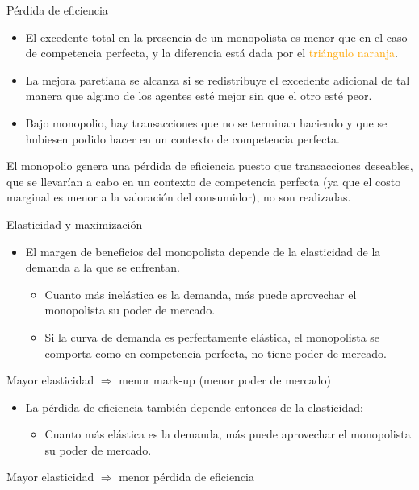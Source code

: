 \documentclass{beamer}
\begin{document}
\begin{frame}{Pérdida de eficiencia}
    \begin{itemize}
        \item El excedente total en la presencia
        de un monopolista es menor que en el caso de competencia perfecta, y la diferencia está dada por el \textcolor{orange}{triángulo naranja}.
        \item La mejora paretiana se alcanza si se redistribuye el excedente adicional de tal manera que alguno de los agentes esté mejor sin que el otro esté peor.
        \item Bajo monopolio, hay transacciones que no se terminan haciendo y que se hubiesen podido hacer en un contexto de competencia perfecta.
    \end{itemize}
    \begin{boxB}
    \centering
        El monopolio genera una pérdida de eficiencia puesto que transacciones deseables, que se llevarían a cabo en un contexto de competencia perfecta  (ya que el costo marginal es menor a la valoración del consumidor), no son realizadas.
    \end{boxB}
\end{frame}

\begin{frame}{Elasticidad y maximización}
    \begin{itemize}
    \item El margen de beneficios del monopolista depende de la elasticidad de la demanda a la que se enfrentan.
        \begin{itemize}
        \item  Cuanto más inelástica es la demanda, más puede aprovechar el monopolista  su poder de mercado. 
        \item Si la curva de demanda es perfectamente elástica, el monopolista se comporta como en competencia perfecta, no tiene poder de mercado. 
        \end{itemize}
    \end{itemize}
    \begin{boxB}
        \centering
        Mayor elasticidad $\Longrightarrow$ menor mark-up (menor poder de mercado)
    \end{boxB}
    \begin{itemize}
    \item La pérdida de eficiencia también depende entonces de la elasticidad:
        \begin{itemize}  
          \item  Cuanto más elástica es la demanda, más puede aprovechar el monopolista  su poder de mercado. 
         \end{itemize}
    \end{itemize}
    \begin{boxB}
    \centering
    Mayor elasticidad $\Longrightarrow$ menor pérdida de eficiencia 
    \end{boxB}
\end{frame}
\end{document}
